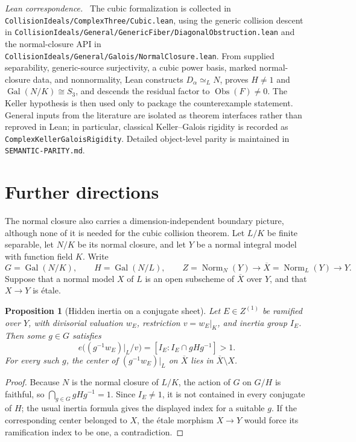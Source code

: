\documentclass[11pt]{article}
\newtheorem{proposition}[theorem]{Proposition}
\theoremstyle{remark}
\DeclareMathOperator{\Gal}{Gal}
\DeclareMathOperator{\Norm}{Norm}
\newcommand{\Obs}{\operatorname{Obs}}
\newcommand{\leanpath}[1]{\texttt{\nolinkurl{#1}}}
\newenvironment{leanfiles}
  {\par\medskip\begingroup\footnotesize\raggedright\noindent
   \textit{Lean correspondence.}\ }
  {\par\endgroup\medskip}
\begin{document}
\begin{leanfiles}
The cubic formalization is collected in
\leanpath{CollisionIdeals/ComplexThree/Cubic.lean}, using the generic
collision descent in
\leanpath{CollisionIdeals/General/GenericFiber/DiagonalObstruction.lean}
and the normal-closure API in
\leanpath{CollisionIdeals/General/Galois/NormalClosure.lean}.
From supplied separability, generic-source surjectivity, a cubic power
basis, marked normal-closure data, and nonnormality, Lean constructs
\(D_\alpha\simeq_L N\), proves \(H\neq1\) and
\(\Gal(N/K)\cong S_3\), and descends the residual factor to
\(\Obs(F)\neq0\).  The Keller hypothesis is then used only to package the
counterexample statement.  General inputs from the literature are isolated
as theorem interfaces rather than reproved in Lean; in particular,
classical Keller--Galois rigidity is recorded as
\leanpath{ComplexKellerGaloisRigidity}.  Detailed object-level parity is
maintained in \leanpath{SEMANTIC-PARITY.md}.
\end{leanfiles}

\section{Further directions}
\label{sec:further-directions}

The normal closure also carries a dimension-independent boundary picture,
although none of it is needed for the cubic collision theorem.  Let
\(L/K\) be finite separable, let \(N/K\) be its normal closure, and let
\(Y\) be a normal integral model with function field \(K\).  Write
\[
  G=\Gal(N/K),\qquad H=\Gal(N/L),\qquad
  Z=\Norm_N(Y)\longrightarrow \overline X=\Norm_L(Y)\longrightarrow Y.
\]
Suppose that a normal model \(X\) of \(L\) is an open subscheme of
\(\overline X\) over \(Y\), and that \(X\to Y\) is \'etale.

\begin{proposition}[Hidden inertia on a conjugate sheet]
\label{prop:generic-hidden-inertia}
Let \(E\in Z^{(1)}\) be ramified over \(Y\), with divisorial valuation
\(w_E\), restriction \(v=w_E|_K\), and inertia group \(I_E\).  Then some
\(g\in G\) satisfies
\[
  e\bigl((g^{-1}w_E)|_L/v\bigr)
  =[I_E:I_E\cap gHg^{-1}]>1.
\]
For every such \(g\), the center of \((g^{-1}w_E)|_L\) on
\(\overline X\) lies in \(\overline X\setminus X\).
\end{proposition}

\begin{proof}
Because \(N\) is the normal closure of \(L/K\), the action of \(G\) on
\(G/H\) is faithful, so \(\bigcap_{g\in G}gHg^{-1}=1\).  Since
\(I_E\neq1\), it is not contained in every conjugate of \(H\); the usual
inertia formula gives the displayed index for a suitable \(g\).  If the
corresponding center belonged to \(X\), the \'etale morphism \(X\to Y\)
would force its ramification index to be one, a contradiction.
\end{proof}
\end{document}
